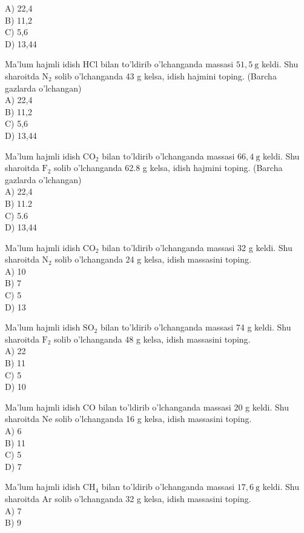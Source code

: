 A) 22,4\\
B) 11,2\\
C) 5,6\\
D) 13,44
  \item Ma'lum hajmli idish HCl bilan to'ldirib o'lchanganda massasi $51,5 \mathrm{~g}$ keldi. Shu sharoitda $\mathrm{N}_{2}$ solib o'lchanganda 43 g kelsa, idish hajmini toping. (Barcha gazlarda o'lchangan)\\
A) 22,4\\
B) 11,2\\
C) 5,6\\
D) 13,44
  \item Ma'lum hajmli idish $\mathrm{CO}_{2}$ bilan to'ldirib o'lchanganda massasi $66,4 \mathrm{~g}$ keldi.
Shu sharoitda $\mathrm{F}_{2}$ solib o'lchanganda 62.8 g kelsa, idish hajmini toping. (Barcha gazlarda o'lchangan)\\
A) 22,4\\
B) 11.2\\
C) 5.6\\
D) 13,44
  \item Ma'lum hajmli idish $\mathrm{CO}_{2}$ bilan to'ldirib o'lchanganda massasi 32 g keldi. Shu sharoitda $\mathrm{N}_{2}$ solib o'lchanganda 24 g kelsa, idish massasini toping.\\
A) 10\\
B) 7\\
C) 5\\
D) 13
  \item Ma'lum hajmli idish $\mathrm{SO}_{2}$ bilan to'ldirib o'lchanganda massasi 74 g keldi. Shu sharoitda $\mathrm{F}_{2}$ solib o'lchanganda 48 g kelsa, idish massasini toping.\\
A) 22\\
B) 11\\
C) 5\\
D) 10
  \item Ma'lum hajmli idish CO bilan to'ldirib o'lchanganda massasi 20 g keldi. Shu sharoitda Ne solib o'lchanganda 16 g kelsa, idish massasini toping.\\
A) 6\\
B) 11\\
C) 5\\
D) 7
  \item Ma'lum hajmli idish $\mathrm{CH}_{4}$ bilan to'ldirib o'lchanganda massasi $17,6 \mathrm{~g}$ keldi. Shu sharoitda Ar solib o'lchanganda 32 g kelsa, idish massasini toping.\\
A) 7\\
B) 9\\

